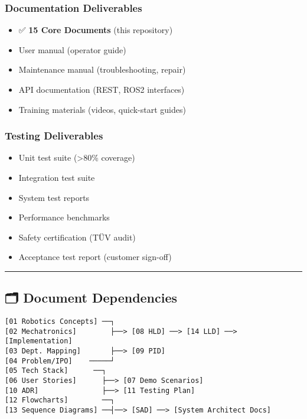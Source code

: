 \documentclass[
]{article}
\providecommand{\tightlist}{%
  \setlength{\itemsep}{0pt}\setlength{\parskip}{0pt}}
\begin{document}
\hypertarget{documentation-deliverables}{%
\subsubsection{Documentation
Deliverables}\label{documentation-deliverables}}

\begin{itemize}
\tightlist
\item
  ✅ \textbf{15 Core Documents} (this repository)
\item
  User manual (operator guide)
\item
  Maintenance manual (troubleshooting, repair)
\item
  API documentation (REST, ROS2 interfaces)
\item
  Training materials (videos, quick-start guides)
\end{itemize}

\hypertarget{testing-deliverables}{%
\subsubsection{Testing Deliverables}\label{testing-deliverables}}

\begin{itemize}
\tightlist
\item
  Unit test suite (\textgreater80\% coverage)
\item
  Integration test suite
\item
  System test reports
\item
  Performance benchmarks
\item
  Safety certification (TÜV audit)
\item
  Acceptance test report (customer sign-off)
\end{itemize}

\begin{center}\rule{0.5\linewidth}{0.5pt}\end{center}

\hypertarget{document-dependencies}{%
\subsection{🗂️ Document Dependencies}\label{document-dependencies}}

\begin{verbatim}
[01 Robotics Concepts] ──┐
[02 Mechatronics]        ├──> [08 HLD] ──> [14 LLD] ──> [Implementation]
[03 Dept. Mapping]       ├──> [09 PID]
[04 Problem/IPO]    ─────┘
[05 Tech Stack]      ──┐
[06 User Stories]      ├──> [07 Demo Scenarios]
[10 ADR]               ├──> [11 Testing Plan]
[12 Flowcharts]        ──┐
[13 Sequence Diagrams] ──┤──> [SAD] ──> [System Architect Docs]
\end{verbatim}
\end{document}
